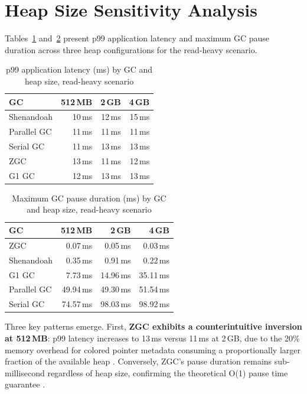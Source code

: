 \section{Heap Size Sensitivity Analysis}
\label{sec:heap-sensitivity}

Tables~\ref{tab:p99-heap} and~\ref{tab:gcpause-heap} present p99 application latency and maximum GC pause duration across three heap configurations for the read-heavy scenario.

\begin{table}[htbp]
\centering
\caption{p99 application latency (ms) by GC and heap size, read-heavy scenario}
\label{tab:p99-heap}
\begin{tabular}{lrrr}
\hline
\textbf{GC} & \textbf{512\,MB} & \textbf{2\,GB} & \textbf{4\,GB} \\
\hline
Shenandoah  & 10\,ms & 12\,ms & 15\,ms \\
Parallel GC & 11\,ms & 11\,ms & 11\,ms \\
Serial GC   & 11\,ms & 13\,ms & 13\,ms \\
ZGC         & 13\,ms & 11\,ms & 12\,ms \\
G1 GC       & 12\,ms & 13\,ms & 13\,ms \\
\hline
\end{tabular}
\end{table}

\begin{table}[htbp]
\centering
\caption{Maximum GC pause duration (ms) by GC and heap size, read-heavy scenario}
\label{tab:gcpause-heap}
\begin{tabular}{lrrr}
\hline
\textbf{GC} & \textbf{512\,MB} & \textbf{2\,GB} & \textbf{4\,GB} \\
\hline
ZGC         &  0.07\,ms &  0.05\,ms &  0.03\,ms \\
Shenandoah  &  0.35\,ms &  0.91\,ms &  0.22\,ms \\
G1 GC       &  7.73\,ms & 14.96\,ms & 35.11\,ms \\
Parallel GC & 49.94\,ms & 49.30\,ms & 51.54\,ms \\
Serial GC   & 74.57\,ms & 98.03\,ms & 98.92\,ms \\
\hline
\end{tabular}
\end{table}

Three key patterns emerge. First, \textbf{ZGC exhibits a counterintuitive inversion at 512\,MB}: p99 latency increases to 13\,ms versus 11\,ms at 2\,GB, due to the 20\% memory overhead for colored pointer metadata consuming a proportionally larger fraction of the available heap \cite{oracle2023gc}. Conversely, ZGC's pause duration remains sub-millisecond regardless of heap size, confirming the theoretical O(1) pause time guarantee \cite{jep333}.

